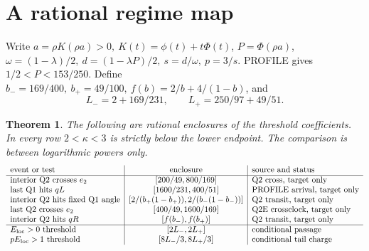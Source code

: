 \documentclass[11pt]{article}
\newtheorem{theorem}{Theorem}\newtheorem{lemma}{Lemma}
\begin{document}
\section{A rational regime map}\label{an04crav1:map}
Write \(a=\rho K(\rho a)>0,\ K(t)=\phi(t)+t\Phi(t)\),
\(P=\Phi(\rho a)\), \(\omega=(1-\lambda)/2,\ d=(1-\lambda P)/2,\
s=d/\omega,\ p=3/s\). PROFILE gives \(1/2<P<153/250\).
Define \(b_-=169/400,\ b_+=49/100,\ f(b)=2/b+4/(1-b)\), and
\[
 L_-=2+169/231,\qquad L_+=250/97+49/51.
\]
\begin{theorem}\label{an04crav1:thresholds}
The following are rational enclosures of the threshold coefficients.
In every row \(2<\kappa<3\) is strictly below the lower endpoint.
The comparison is between logarithmic powers only.
\[
\begin{array}{l|c|l}
\text{event or test}&\text{enclosure}&\text{source and status}\\ \hline
\text{interior Q2 crosses }e_2 &[200/49,800/169]&\text{Q2 cross, target only}\\
\text{last Q1 hits }qL &[1600/231,400/51]&\text{PROFILE arrival, target only}\\
\text{interior Q2 hits fixed Q1 angle}
 &[2/(b_+(1-b_+)),2/(b_-(1-b_-))]&\text{Q2 transit, target only}\\
\text{last Q2 crosses }e_2 &[400/49,1600/169]&\text{Q2E crossclock, target only}\\
\text{interior Q2 hits }qR &[f(b_-),f(b_+)]&\text{Q2 transit, target only}\\ \hline
 E_{\rm loc}>0\text{ threshold}&[2L_-,2L_+]&\text{conditional passage}\\
 pE_{\rm loc}>1\text{ threshold}&[8L_-/3,8L_+/3]&\text{conditional tail charge}
\end{array}
\]
\end{theorem}
\end{document}
